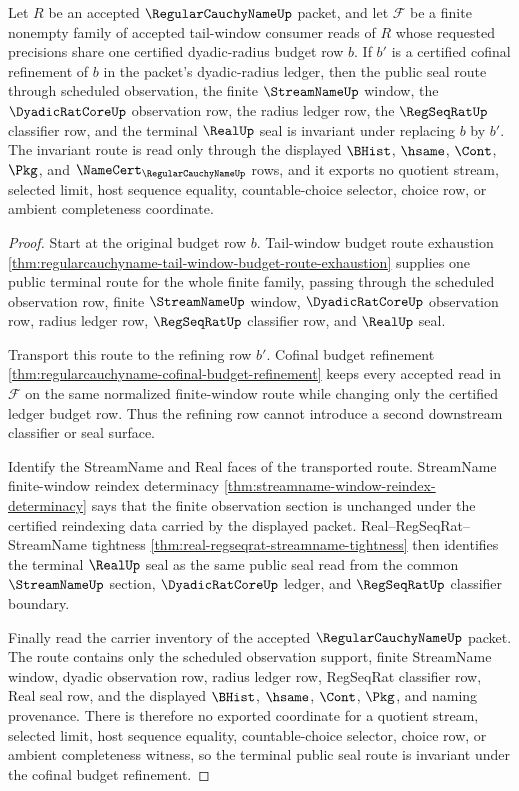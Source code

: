 \begin{theorem}
\label{thm:regularcauchyname-tail-budget-refinement-invariance}
Let $R$ be an accepted $\RegularCauchyNameUp$ packet, and let $\mathcal{F}$ be a finite nonempty family of accepted tail-window consumer reads of $R$ whose requested precisions share one certified dyadic-radius budget row $b$. If $b'$ is a certified cofinal refinement of $b$ in the packet's dyadic-radius ledger, then the public seal route through scheduled observation, the finite $\StreamNameUp$ window, the $\DyadicRatCoreUp$ observation row, the radius ledger row, the $\RegSeqRatUp$ classifier row, and the terminal $\RealUp$ seal is invariant under replacing $b$ by $b'$. The invariant route is read only through the displayed $\BHist$, $\hsame$, $\Cont$, $\Pkg$, and $\NameCert_{\RegularCauchyNameUp}$ rows, and it exports no quotient stream, selected limit, host sequence equality, countable-choice selector, choice row, or ambient completeness coordinate.
\end{theorem}
\begin{proof}
Start at the original budget row $b$. Tail-window budget route exhaustion \autoref{thm:regularcauchyname-tail-window-budget-route-exhaustion} supplies one public terminal route for the whole finite family, passing through the scheduled observation row, finite $\StreamNameUp$ window, $\DyadicRatCoreUp$ observation row, radius ledger row, $\RegSeqRatUp$ classifier row, and $\RealUp$ seal.

Transport this route to the refining row $b'$. Cofinal budget refinement \autoref{thm:regularcauchyname-cofinal-budget-refinement} keeps every accepted read in $\mathcal{F}$ on the same normalized finite-window route while changing only the certified ledger budget row. Thus the refining row cannot introduce a second downstream classifier or seal surface.

Identify the StreamName and Real faces of the transported route. StreamName finite-window reindex determinacy \autoref{thm:streamname-window-reindex-determinacy} says that the finite observation section is unchanged under the certified reindexing data carried by the displayed packet. Real--RegSeqRat--StreamName tightness \autoref{thm:real-regseqrat-streamname-tightness} then identifies the terminal $\RealUp$ seal as the same public seal read from the common $\StreamNameUp$ section, $\DyadicRatCoreUp$ ledger, and $\RegSeqRatUp$ classifier boundary.

Finally read the carrier inventory of the accepted $\RegularCauchyNameUp$ packet. The route contains only the scheduled observation support, finite StreamName window, dyadic observation row, radius ledger row, RegSeqRat classifier row, Real seal row, and the displayed $\BHist$, $\hsame$, $\Cont$, $\Pkg$, and naming provenance. There is therefore no exported coordinate for a quotient stream, selected limit, host sequence equality, countable-choice selector, choice row, or ambient completeness witness, so the terminal public seal route is invariant under the cofinal budget refinement.
\end{proof}


